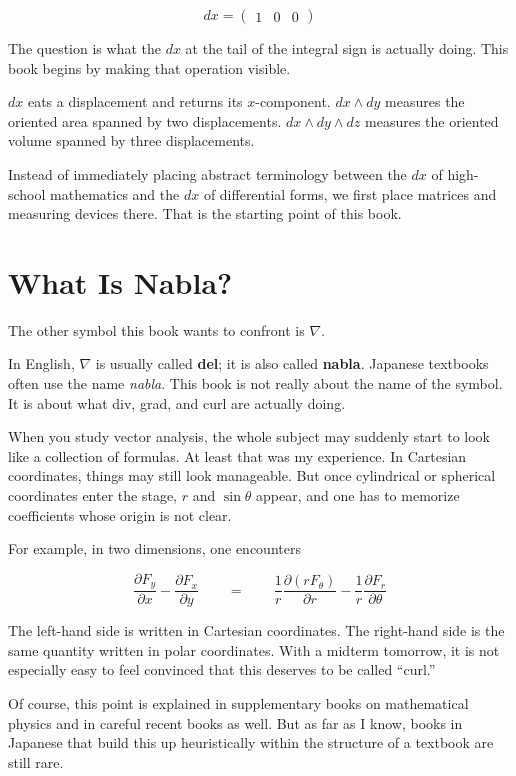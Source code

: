 \[
dx=\begin{pmatrix}1&0&0\end{pmatrix}
\]

The question is what the \(dx\) at the tail of the integral sign is
actually doing. This book begins by making that operation visible.

\(dx\) eats a displacement and returns its \(x\)-component.
\(dx\wedge dy\) measures the oriented area spanned by two displacements.
\(dx\wedge dy\wedge dz\) measures the oriented volume spanned by three
displacements.

Instead of immediately placing abstract terminology between the \(dx\)
of high-school mathematics and the \(dx\) of differential forms, we
first place matrices and measuring devices there. That is the starting
point of this book.

\hypertarget{what-is-nabla}{%
\section{What Is Nabla?}\label{what-is-nabla}}

The other symbol this book wants to confront is \(\nabla\).

In English, \(\nabla\) is usually called \textbf{del}; it is also called
\textbf{nabla}. Japanese textbooks often use the name \emph{nabla}. This
book is not really about the name of the symbol. It is about what div,
grad, and curl are actually doing.

When you study vector analysis, the whole subject may suddenly start to
look like a collection of formulas. At least that was my experience. In
Cartesian coordinates, things may still look manageable. But once
cylindrical or spherical coordinates enter the stage, \(r\) and
\(\sin\theta\) appear, and one has to memorize coefficients whose origin
is not clear.

For example, in two dimensions, one encounters

\[
\frac{\partial F_y}{\partial x}-\frac{\partial F_x}{\partial y}
\qquad=\qquad
\frac{1}{r}\frac{\partial (r F_\theta)}{\partial r}-\frac{1}{r}\frac{\partial F_r}{\partial \theta}
\]

The left-hand side is written in Cartesian coordinates. The right-hand
side is the same quantity written in polar coordinates. With a midterm
tomorrow, it is not especially easy to feel convinced that this deserves
to be called ``curl.''

Of course, this point is explained in supplementary books on
mathematical physics and in careful recent books as well. But as far as
I know, books in Japanese that build this up heuristically within the
structure of a textbook are still rare.

